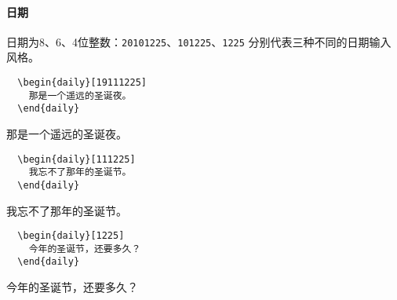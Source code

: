 \documentclass{SYSUDaily}
\begin{document}
\paragraph{日期}
日期为8、6、4位整数：\verb|20101225|、\verb|101225|、\verb|1225| 分别代表三种不同的日期输入风格。

\begin{multicols}{2}
	\begin{lstlisting}
  \begin{daily}[19111225]
    那是一个遥远的圣诞夜。
  \end{daily}
  \end{lstlisting}
	\small
	\begin{daily}[19111225]
		那是一个遥远的圣诞夜。
	\end{daily}
\end{multicols}


\begin{multicols}{2}
	\begin{lstlisting}
  \begin{daily}[111225]
    我忘不了那年的圣诞节。
  \end{daily}
  \end{lstlisting}
	\small
	\begin{daily}[111225]
		我忘不了那年的圣诞节。
	\end{daily}
\end{multicols}


\begin{multicols}{2}
	\begin{lstlisting}
  \begin{daily}[1225]
    今年的圣诞节，还要多久？
  \end{daily}
  \end{lstlisting}
	\small
	\begin{daily}[1225]
		今年的圣诞节，还要多久？
	\end{daily}
\end{multicols}
\end{document}
